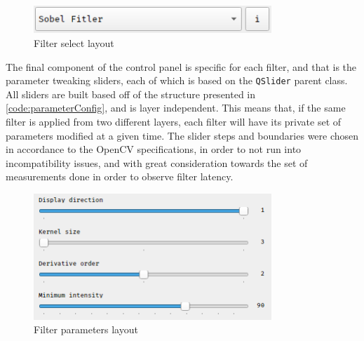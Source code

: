 \begin{figure}[H]
	\includegraphics[width=0.8\textwidth, height=0.09\textwidth]{resources/Buttons_Selector.png}
	\caption{Filter select layout}
\end{figure}

The final component of the control panel is specific for each filter, and that is the parameter tweaking
sliders, each of which is based on the \verb|QSlider| parent class. All sliders are built based off of the
structure presented in \cref{code:parameterConfig}, and is layer independent. This means that, if the same
filter is applied from two different layers, each filter will have its private set of parameters modified
at a given time. The slider steps and boundaries were chosen in accordance to the OpenCV specifications,
in order to not run into incompatibility issues, and with great consideration towards the set of measurements
done in order to observe filter latency.

\begin{figure}[H]
	\includegraphics[width=0.8\textwidth, height=0.5\textwidth]{resources/Buttons_Sliders.png}
	\caption{Filter parameters layout}
\end{figure}



